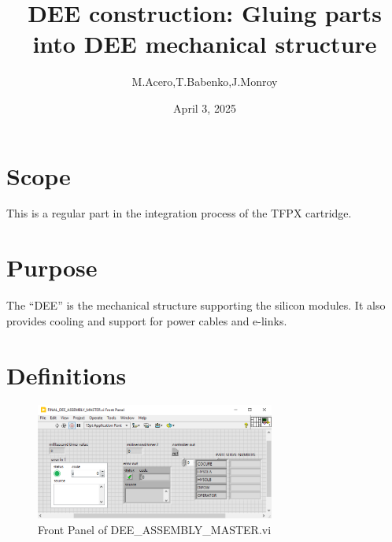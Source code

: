 \documentclass[12pt]{cornelltfpxsop}
\title{DEE construction: Gluing  parts into DEE mechanical structure}
\date{April 3, 2025}
\author{M.Acero,T.Babenko,J.Monroy}
\begin{document}
\maketitle
\section{Scope}
This is a regular part in the integration process of the TFPX cartridge.

\section{Purpose}
The ``DEE'' is the mechanical structure supporting the silicon modules. It also provides cooling and support for power cables and e-links.    

\section{Definitions}
\begin{center}
\begin{figure}[h!]
\includegraphics[width=0.7\textwidth]{img/Front_panel2.png}
\caption{Front Panel of DEE\_ASSEMBLY\_MASTER.vi}
\label{front_panel}
\end{figure}
\end{center}
\end{document}
